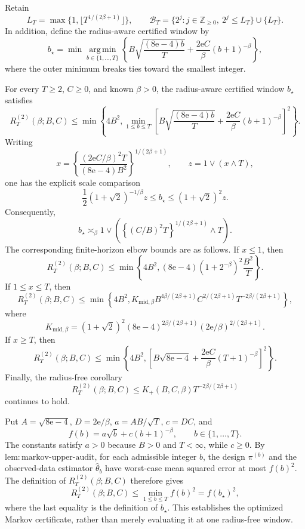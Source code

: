 Retain
\[
 L_T=\max\{1,\lfloor T^{1/(2\beta+1)}\rfloor\},
 \qquad
 \mathcal B_T=\{2^j:j\in\mathbb Z_{\ge0},\ 2^j\le L_T\}\cup\{L_T\}.
\]
In addition, define the radius-aware certified window by
\[
 b_\star
 =\min\operatorname*{arg\,min}_{b\in\{1,\ldots,T\}}
 \left\{
 B\sqrt{\frac{(8\mathrm e-4)b}{T}}
 +\frac{2\mathrm e C}{\beta}(b+1)^{-\beta}
 \right\},
\]
where the outer minimum breaks ties toward the smallest integer.

For every \(T\ge2\), \(C\ge0\), and known \(\beta>0\), the radius-aware certified window \(b_\star\) satisfies
\[
 R_T^{(2)}(\beta;B,C)
 \le
 \min\!\left\{
 4B^2,
 \min_{1\le b\le T}
 \left[
 B\sqrt{\frac{(8\mathrm e-4)b}{T}}
 +\frac{2\mathrm e C}{\beta}(b+1)^{-\beta}
 \right]^2
 \right\}.
\]
Writing
\[
 x=\left\{
 \frac{(2\mathrm e C/\beta)^2T}{(8\mathrm e-4)B^2}
 \right\}^{1/(2\beta+1)},
 \qquad z=1\vee(x\wedge T),
\]
one has the explicit scale comparison
\[
 \frac12(1+\sqrt2)^{-1/\beta}z
 \le b_\star\le(1+\sqrt2)^2z.
\]
Consequently,
\[
 b_\star\asymp_\beta
 1\vee\left(
 \left\{(C/B)^2T\right\}^{1/(2\beta+1)}\wedge T
 \right).
\]
The corresponding finite-horizon elbow bounds are as follows.  If \(x\le1\), then
\[
 R_T^{(2)}(\beta;B,C)
 \le
 \min\left\{4B^2,(8\mathrm e-4)(1+2^{-\beta})^2\frac{B^2}{T}\right\}.
\]
If \(1\le x\le T\), then
\[
 R_T^{(2)}(\beta;B,C)
 \le
 \min\left\{4B^2,
 K_{\mathrm{mid},\beta}
 B^{4\beta/(2\beta+1)}C^{2/(2\beta+1)}
 T^{-2\beta/(2\beta+1)}
 \right\},
\]
where
\[
 K_{\mathrm{mid},\beta}
 =(1+\sqrt2)^2(8\mathrm e-4)^{2\beta/(2\beta+1)}
 (2\mathrm e/\beta)^{2/(2\beta+1)}.
\]
If \(x\ge T\), then
\[
 R_T^{(2)}(\beta;B,C)
 \le
 \min\left\{4B^2,
 \left[B\sqrt{8\mathrm e-4}
 +\frac{2\mathrm e C}{\beta}(T+1)^{-\beta}\right]^2
 \right\}.
\]
Finally, the radius-free corollary
\[
 R_T^{(2)}(\beta;B,C)
 \le K_+(B,C,\beta)T^{-2\beta/(2\beta+1)}
\]
continues to hold.

Put \(A=\sqrt{8\mathrm e-4}\), \(D=2\mathrm e/\beta\), \(a=AB/\sqrt T\), \(c=DC\), and
\[
 f(b)=a\sqrt b+c(b+1)^{-\beta},
 \qquad b\in\{1,\ldots,T\}.
\]
The constants satisfy \(a>0\) because \(B>0\) and \(T<\infty\), while \(c\ge0\).  By \(\mathrm{lem{:}markov\mbox{-}upper\mbox{-}audit}\), for each admissible integer \(b\), the design \(\pi^{(b)}\) and the observed-data estimator \(\widehat\theta_b\) have worst-case mean squared error at most \(f(b)^2\).  The definition of \(R_T^{(2)}(\beta;B,C)\) therefore gives
\[
 R_T^{(2)}(\beta;B,C)\le\min_{1\le b\le T}f(b)^2=f(b_\star)^2,
\]
where the last equality is the definition of \(b_\star\).  This establishes the optimized Markov certificate, rather than merely evaluating it at one radius-free window.


